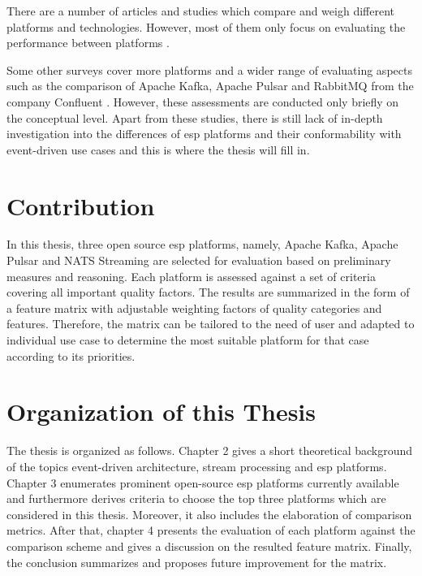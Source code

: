 There are a number of articles and studies which compare and weigh different platforms and technologies. However, most of them only focus on evaluating the performance between platforms \cite{benchmarkkafkapulsarrabbitmq} \cite{benchmarkfull} \cite{benchmarkkafkapulsar}.

Some other surveys cover more platforms and a wider range of evaluating aspects such as the comparison of Apache Kafka, Apache Pulsar and RabbitMQ from the company Confluent \cite{overallcomparekafka}. However, these assessments are conducted only briefly on the conceptual level. Apart from these studies, there is still lack of in-depth investigation into the differences of \acrshort{esp} platforms and their conformability with event-driven use cases and this is where the thesis will fill in.
 
\section{Contribution}
In this thesis, three open source \acrshort{esp} platforms, namely, Apache Kafka, Apache Pulsar and NATS Streaming are selected for evaluation based on preliminary measures and reasoning. Each platform is assessed against a set of criteria covering all important quality factors. The results are summarized in the form of a feature matrix with adjustable weighting factors of quality categories and features. Therefore, the matrix can be tailored to the need of user and adapted to individual use case to determine the most suitable platform for that case according to its priorities.


\section{Organization of this Thesis}
The thesis is organized as follows. Chapter 2 gives a short theoretical background of the topics event-driven architecture, stream processing and \acrshort{esp} platforms. Chapter 3 enumerates prominent open-source \acrshort{esp} platforms currently available and furthermore derives criteria to choose the top three platforms which are considered in this thesis. Moreover, it also includes the elaboration of comparison metrics. After that, chapter 4 presents the evaluation of each platform against the comparison scheme and gives a discussion on the resulted feature matrix. Finally, the conclusion summarizes and proposes future improvement for the matrix.

